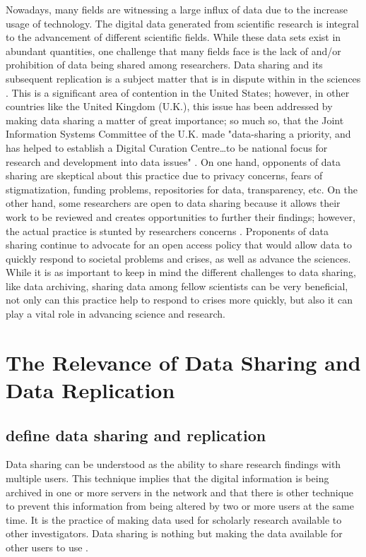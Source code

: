 \documentclass[sigconf]{acmart}
\begin{document}
Nowadays, many fields are witnessing a large influx of data due to the increase usage of technology. The digital data generated from scientific research is integral to the advancement of different scientific fields. While these data sets exist in abundant quantities, one challenge that many fields face is the lack of and/or prohibition of data being shared among researchers. Data sharing and its subsequent replication is a subject matter that is in dispute within in the sciences \cite{leetaru2016}. This is a significant area of contention in the United States; however, in other countries like the United Kingdom (U.K.), this issue has been addressed by making data sharing a matter of great importance; so much so, that the Joint Information Systems Committee of the U.K. made "data-sharing a priority, and has helped to establish a Digital Curation Centre…to be national focus for research and development into data issues" \cite{pryor2009skilling}. On one hand, opponents of data sharing are skeptical about this practice due to privacy concerns, fears of stigmatization, funding problems, repositories for data, transparency, etc. On the other hand, some researchers are open to data sharing because it allows their work to be reviewed and creates opportunities to further their findings; however, the actual practice is stunted by researchers concerns \cite{nelson2009empty}. Proponents of data sharing continue to advocate for an open access policy that would allow data to quickly respond to societal problems and crises, as well as advance the sciences. While it is as important to keep in mind the different challenges to data sharing, like data archiving, sharing data among fellow scientists can be very beneficial, not only can this practice help to respond to crises more quickly, but also it can play a vital role in advancing science and research.


\section{The Relevance of Data Sharing and Data Replication }


\subsection{ define data sharing and replication}

Data sharing can be understood as the ability to share research findings with multiple users. This technique implies that the digital information is being archived in one or more servers in the network and that there is other technique to prevent this information from being altered by two or more users at the same time. It is the practice of making data used for scholarly research available to other investigators. Data sharing is nothing but making the data available for other users to use \cite{Datasharing}. 
\end{document}
